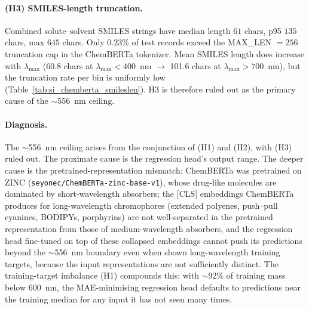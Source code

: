 \documentclass[journal=jcisd8,manuscript=suppinfo]{achemso}
\begin{document}
\paragraph{(H3) SMILES-length truncation.}
Combined solute--solvent SMILES strings have median length $61$ chars, p95 $135$ chars, max $645$ chars. Only $0.23$\% of test records exceed the MAX\_LEN $= 256$ truncation cap in the ChemBERTa tokenizer. Mean SMILES length does increase with $\lambda_{\max}$ (60.8 chars at $\lambda_{\max} < 400$~nm $\to$ 101.6 chars at $\lambda_{\max} > 700$~nm), but the truncation rate per bin is uniformly low (Table~\ref{tab:si_chemberta_smileslen}). H3 is therefore ruled out as the primary cause of the $\sim$556~nm ceiling.

\begin{table}[htbp]
\centering
\caption{Combined solute--solvent SMILES length statistics by experimental $\lambda_{\max}$ bin (v3 pooled-5-fold test set). ``Frac trunc'' = fraction of records in that bin whose combined SMILES exceeds the MAX\_LEN $= 256$ token cap used by the ChemBERTa tokenizer.}
\label{tab:si_chemberta_smileslen}
\small
{}
\end{table}

\paragraph{Diagnosis.}
The $\sim$556~nm ceiling arises from the conjunction of (H1) and (H2), with (H3) ruled out. The proximate cause is the regression head's output range. The deeper cause is the pretrained-representation mismatch: ChemBERTa was pretrained on ZINC (\texttt{seyonec/ChemBERTa-zinc-base-v1}), whose drug-like molecules are dominated by short-wavelength absorbers; the [CLS] embeddings ChemBERTa produces for long-wavelength chromophores (extended polyenes, push--pull cyanines, BODIPYs, porphyrins) are not well-separated in the pretrained representation from those of medium-wavelength absorbers, and the regression head fine-tuned on top of these collapsed embeddings cannot push its predictions beyond the $\sim$556~nm boundary even when shown long-wavelength training targets, because the input representations are not sufficiently distinct. The training-target imbalance (H1) compounds this: with $\sim$92\% of training mass below $600$~nm, the MAE-minimising regression head defaults to predictions near the training median for any input it has not seen many times.
\end{document}
